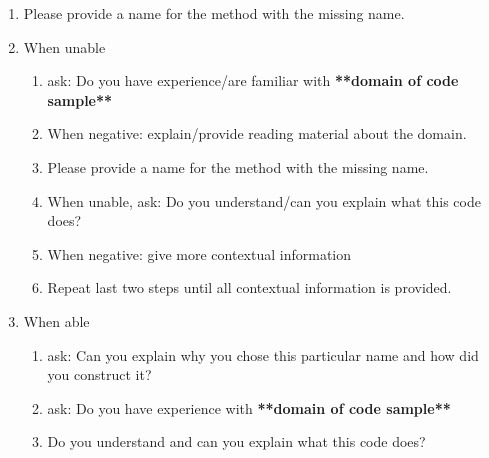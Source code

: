 \begin{enumerate}
\item Please provide a name for the method with the missing name.

\item When unable 
	\begin{enumerate}
	\item ask: Do you have experience/are familiar with \textbf{**domain of code sample**}
	\item When negative: explain/provide reading material about the domain.
	\item Please provide a name for the method with the missing name.
	\item When unable, ask: Do you understand/can you explain what this code does?
	\item When negative: give more contextual information
	\item Repeat last two steps until all contextual information is provided.
	\end{enumerate}
\item When able
	\begin{enumerate}
	\item ask: Can you explain why you chose this particular name and how did you construct it?
	\item ask: Do you have experience with \textbf{**domain of code sample**}
	\item Do you understand and can you explain what this code does?
	\end{enumerate}
\end{enumerate}